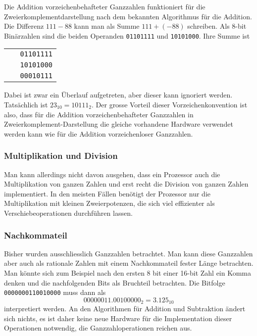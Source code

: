 Die Addition vorzeichenbehafteter Ganzzahlen funktioniert für die
Zweierkomplementdarstellung nach dem bekannten Algorithmus für die
Addition.
Die Differenz $111-88$ kann man als Summe $111+(-88)$ schreiben.
Als 8-bit Binärzahlen sind die beiden Operanden
\texttt{01101111} und \texttt{10101000}.
Ihre Summe ist
\begin{center}
\begin{tabular}{>{\tt}r}
01101111\\
10101000\\
\hline
{\color{gray}}\,
00010111\\
\end{tabular}
\end{center}
Dabei ist zwar ein Überlauf aufgetreten, aber dieser kann ignoriert
werden.
Tatsächlich ist $23_{10}=10111_2$.
Der grosse Vorteil dieser Vorzeichenkonvention ist also, dass
für die Addition vorzeichenbehafteter Ganzzahlen in
Zweierkomplement-Darstellung die gleiche vorhandene Hardware verwendet
werden kann wie für die Addition vorzeichenloser Ganzzahlen.

\subsubsection{Multiplikation und Division}
Man kann allerdings nicht davon ausgehen, dass ein Prozessor auch
die Multiplikation von ganzen Zahlen und erst recht die Division
von ganzen Zahlen implementiert.
%
%
In den meisten Fällen benötigt der Prozessor nur die Multiplikation
mit kleinen Zweierpotenzen, die sich viel effizienter als
Verschiebeoperationen durchführen lassen.
%
%

\subsubsection{Nachkommateil}
%
Bisher wurden ausschliesslich Ganzzahlen betrachtet.
Man kann diese Ganzzahlen aber auch als rationale Zahlen mit einem
Nachkommateil fester Länge betrachten.
%
%
Man könnte sich zum Beispiel nach den ersten 8 bit einer 16-bit Zahl
ein Komma denken und die nachfolgenden Bits als Bruchteil
betrachten.
Die Bitfolge \texttt{0000000110010000} muss dann als
\[
00000011.00100000_2
=
3.125_{10}
\]
interpretiert werden.
An den Algorithmen für Addition und Subtraktion ändert sich nichts,
es ist daher keine neue Hardware für die Implementation dieser
Operationen notwendig, die Ganzzahloperationen reichen aus.
%

